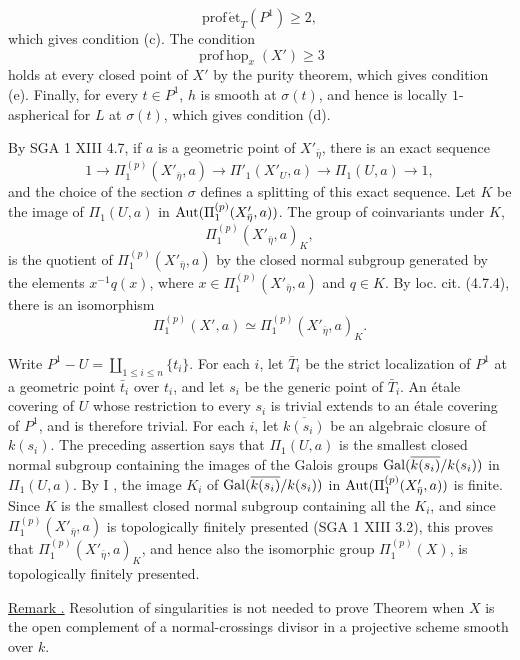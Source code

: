 \[
 \operatorname{prof\,\acute et}_T(P^1)\geq 2,
\]
which gives condition (c). The condition
\[
 \operatorname{prof\,hop}_x(X')\geq 3
\]
holds at every closed point of $X'$ by the purity theorem, which gives
condition (e). Finally, for every $t\in P^1$, $h$ is smooth at
$\sigma(t)$, and hence is locally $1$-aspherical for $L$ at $\sigma(t)$,
which gives condition (d).

By SGA 1 XIII 4.7, if $a$ is a geometric point of
$X'_{\bar\eta}$, there is an exact sequence
\[
 1\longrightarrow\Pi_1^{(p)}(X'_{\bar\eta},a)
 \longrightarrow\Pi'_1(X'_U,a)
 \longrightarrow\Pi_1(U,a)\longrightarrow 1,
\]
and the choice of the section $\sigma$ defines a splitting of this exact
sequence. Let $K$ be the image of $\Pi_1(U,a)$ in
$\operatorname{Aut}(\Pi_1^{(p)}(X'_{\bar\eta},a))$. The group of coinvariants under
$K$,
\[
 \Pi_1^{(p)}(X'_{\bar\eta},a)_K,
\]
is the quotient of $\Pi_1^{(p)}(X'_{\bar\eta},a)$ by the closed normal
subgroup generated by the elements $x^{-1}q(x)$, where
$x\in\Pi_1^{(p)}(X'_{\bar\eta},a)$ and $q\in K$. By loc. cit. (4.7.4),
there is an isomorphism
\[
 \Pi_1^{(p)}(X',a)\simeq
 \Pi_1^{(p)}(X'_{\bar\eta},a)_K.
\]

Write $P^1-U=\coprod_{1\leq i\leq n}\{t_i\}$. For each $i$, let
$\bar T_i$ be the strict localization of $P^1$ at a geometric point
$\bar t_i$ over $t_i$, and let $s_i$ be the generic point of $\bar T_i$.
An \'etale covering of $U$ whose restriction to every $s_i$ is trivial
extends to an \'etale covering of $P^1$, and is therefore trivial. For
each $i$, let $\overline{k(s_i)}$ be an algebraic closure of $k(s_i)$.
The preceding assertion says that $\Pi_1(U,a)$ is the smallest closed
normal subgroup containing the images of the Galois groups
$\operatorname{Gal}(\overline{k(s_i)}/k(s_i))$ in $\Pi_1(U,a)$. By I , the image
$K_i$ of $\operatorname{Gal}(\overline{k(s_i)}/k(s_i))$ in
$\operatorname{Aut}(\Pi_1^{(p)}(X'_{\bar\eta},a))$ is finite. Since $K$ is the
smallest closed normal subgroup containing all the $K_i$, and since
$\Pi_1^{(p)}(X'_{\bar\eta},a)$ is topologically finitely presented
(SGA 1 XIII 3.2), this proves that
$\Pi_1^{(p)}(X'_{\bar\eta},a)_K$, and hence also the isomorphic group
$\Pi_1^{(p)}(X)$, is topologically finitely presented.


\underline{Remark .} Resolution of singularities is not needed to
prove Theorem  when $X$ is the open complement of a
normal-crossings divisor in a projective scheme smooth over $k$.

